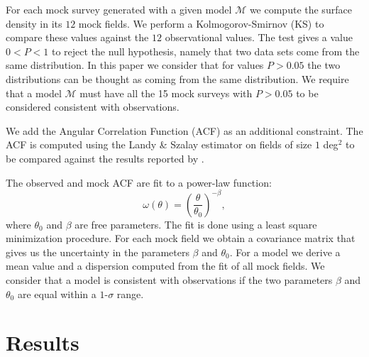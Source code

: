 \documentclass{emulateapj}
\begin{document}
For each mock survey generated with a given model ${\mathcal M}$ we
compute the surface density in its $12$ mock fields. We perform a
Kolmogorov-Smirnov (KS) to compare these values against the $12$
observational values. The test gives a value $0<P<1$ to
reject the null hypothesis, namely that two data sets come from the
same distribution. In this paper we consider that for values $P>0.05$
the two distributions can be thought as coming from the same
distribution. We require that a model ${\mathcal M}$ must have all the 15 mock
surveys with $P>0.05$ to be considered consistent with observations.


We add the Angular Correlation Function (ACF) as an additional
constraint. The ACF is computed using  the Landy \&  Szalay estimator
  \citep{Landy1993}  on fields of size $1$ deg$^2$ to be compared
  against the results reported by \cite{Ouchi2010}.

The observed and mock ACF are fit to a power-law function:
\begin{equation}
\omega(\theta) = \left(\frac{\theta}{\theta_{0}}\right)^{-\beta}, 
\label{eq:fitting}
\end{equation}
%
where $\theta_0$ and $\beta$ are free parameters. The fit is done
using a least square minimization procedure. For each mock field we
obtain a covariance matrix that gives us the uncertainty in the
parameters $\beta$ and $\theta_0$.  For a model we derive a mean
value and a dispersion computed from the fit of all mock fields. We
consider that a model is consistent with observations if the two
parameters $\beta$ and $\theta_0$ are equal within a $1$-$\sigma$
range. 

 
\section{Results}
\label{sec:results}
\end{document}
